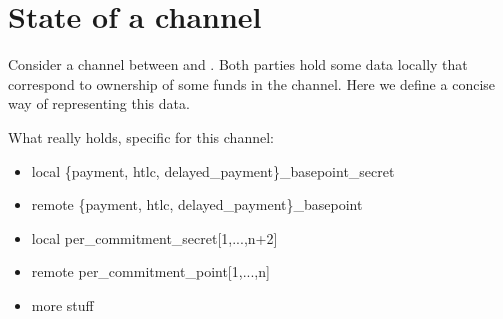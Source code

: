 \section{State of a channel}
  Consider a channel between \alice{} and \bob. Both parties hold some data
  locally that correspond to ownership of some funds in the channel. Here we
  define a concise way of representing this data.

  What \alice{} really holds, specific for this channel:
  \begin{itemize}
    \item local \{payment, htlc, delayed\_payment\}\_basepoint\_secret
    \item remote \{payment, htlc, delayed\_payment\}\_basepoint
    \item local per\_commitment\_secret[1,...,n+2]
    \item remote per\_commitment\_point[1,...,n]
    \item more stuff
  \end{itemize}
